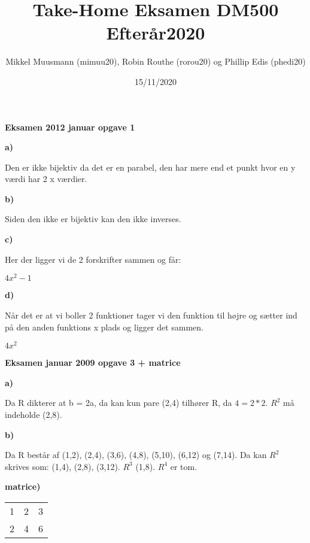 \documentclass{article}
\title{\textbf{Take-Home Eksamen DM500 Efterår2020}}
\author{Mikkel Muusmann (mimuu20), Robin Routhe (rorou20) og Phillip Edis (phedi20)}
\date{15/11/2020}
\begin{document}
\maketitle


\textbf{Eksamen 2012 januar opgave 1}

\textbf{a)}

Den er ikke bijektiv da det er en parabel, den har mere end et punkt
hvor en y værdi har 2 x værdier. 

\vspace{5mm} %

\textbf{b)}

Siden den ikke er bijektiv kan den ikke inverses.

\vspace{5mm} %

\textbf{c)}

Her der ligger vi de 2 forskrifter sammen og får:

$4x^2-1$

\vspace{5mm} %

\textbf{d)}

Når det er at vi boller 2 funktioner tager vi den funktion til højre og sætter ind på den anden funktions x plads og ligger det sammen.

$4x^2$

\vspace{5mm} %

\textbf{Eksamen januar 2009 opgave 3 + matrice}

\textbf{a)}

Da R dikterer at b = 2a,  da kan kun pare (2,4) tilhører R, da $4 = 2*2$. $R^2$ må indeholde (2,8).

\vspace{5mm} %

\textbf{b)}

Da R består af (1,2), (2,4), (3,6), (4,8), (5,10), (6,12) og (7,14). Da kan $R^2$ skrives som: (1,4), (2,8), (3,12). $R^3$ (1,8). $R^4$ er tom.

\vspace{5mm} %

\textbf{matrice)}

\begin{tabular}{ | c | c | c | }
 \hline
 1 & 2 & 3 \\
 2 & 4 & 6 \\
 \hline
\end{tabular}
\end{document}
